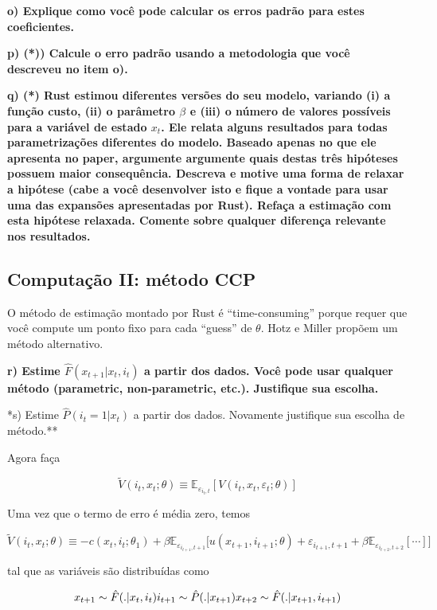 \documentclass[12pt,a4paper]{article}
\begin{document}
\textbf{o) Explique como você pode calcular os erros padrão para estes
coeficientes.}

\textbf{p) (*)) Calcule o erro padrão usando a metodologia que você
descreveu no item o).}

\textbf{q) (*) Rust estimou diferentes versões do seu modelo, variando
(i) a função custo, (ii) o parâmetro \(\beta\) e (iii) o número de
valores possíveis para a variável de estado \(x_t\). Ele relata alguns
resultados para todas parametrizações diferentes do modelo. Baseado
apenas no que ele apresenta no paper, argumente argumente quais destas
três hipóteses possuem maior consequência. Descreva e motive uma forma
de relaxar a hipótese (cabe a você desenvolver isto e fique a vontade
para usar uma das expansões apresentadas por Rust). Refaça a estimação
com esta hipótese relaxada. Comente sobre qualquer diferença relevante
nos resultados.}

\hypertarget{computacao-ii-metodo-ccp}{%
\subsection{Computação II: método CCP}\label{computacao-ii-metodo-ccp}}

O método de estimação montado por Rust é ``time-consuming'' porque
requer que você compute um ponto fixo para cada ``guess'' de \(\theta\).
Hotz e Miller propõem um método alternativo.

\textbf{r) Estime \(\hat{F}(x_{t+1}|x_t,i_t)\) a partir dos dados. Você
pode usar qualquer método (parametric, non-parametric, etc.). Justifique
sua escolha.}

*s) Estime \(\hat{P}(i_t=1|x_t)\) a partir dos dados. Novamente
justifique sua escolha de método.**

Agora faça

\[
\tilde{V} (i_t,x_t;\theta) \equiv \mathbb{E}_{\varepsilon_{i_{t},t}}[V(i_t,x_t,\varepsilon_t;\theta)]
\]

Uma vez que o termo de erro é média zero, temos

\[
\tilde{V} (i_t,x_t;\theta) \equiv -c(x_t,i_t;\theta_1) + \beta \mathbb{E}_{\varepsilon_{i_{t+1},t+1}}\Big[u(x_{t+1},i_{t+1};\theta)+\varepsilon_{i_{t+1},t+1}+\beta\mathbb{E}_{\varepsilon_{i_{t+2},t+2}}[\cdots]\Big]
\]

tal que as variáveis são distribuídas como

\[
x_{t+1} \sim \hat{F}(.|x_t,i_t) \\
i_{t+1} \sim \hat{P}(.|x_{t+1}) \\
x_{t+2} \sim \hat{F}(.|x_{t+1},i_{t+1}) \\
\]
\end{document}
